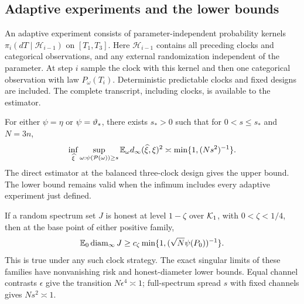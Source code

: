 \subsection{Adaptive experiments and the lower bounds}
An adaptive experiment consists of parameter-independent probability
kernels $\pi_i(dT\mid\mathcal H_{i-1})$ on $[T_1,T_3]$. Here
$\mathcal H_{i-1}$ contains all preceding clocks and categorical
observations, and any external randomization independent of the
parameter. At step $i$ sample the clock with this kernel and then one
categorical observation with law $P_\omega(T_i)$. Deterministic
predictable clocks and fixed designs are included. The complete
transcript, including clocks, is available to the estimator.

\begin{theorem}
\label{thm:statistics}
For either $\psi=\eta$ or $\psi=\vartheta_*$, there exists $s_*>0$
such that for $0<s\le s_*$ and $N=3n$,
\begin{equation}\label{eq:minimax}
 \inf_{\widehat\xi}\sup_{\omega:\psi(\mathcal P(\omega))\ge s}
       \mathbb E_\omega d_\infty(\widehat\xi,\xi)^2
                   \asymp\min\{1,(Ns^2)^{-1}\}.
\end{equation}
The direct estimator at the balanced three-clock design gives the upper
bound. The lower bound remains valid when the infimum includes every
adaptive experiment just defined.

If a random spectrum set $J$ is honest at level $1-\zeta$ over
$\mathcal K_1$, with $0<\zeta<1/4$, then at the base point of either
positive family,
\begin{equation}\label{eq:diameter-lower}
 \mathbb E_0\operatorname{diam}_\infty J\ge c_\zeta
               \min\{1,(\sqrt N\psi(P_0))^{-1}\}.
\end{equation}
This is true under any such clock strategy. The exact singular limits
of these families have nonvanishing risk and honest-diameter lower
bounds. Equal channel contrasts $\epsilon$ give the transition
$N\epsilon^4\asymp1$; full-spectrum spread $s$ with fixed channels
gives $Ns^2\asymp1$.
\end{theorem}
